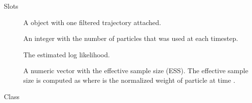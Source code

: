 \documentclass[letterpaper]{book}
\begin{document}
\begin{Section}{Slots}

\begin{description}

\item[] A  object with one filtered
trajectory attached.

\item[] An integer with the number of particles that was
used at each timestep.

\item[] The estimated log likelihood.

\item[] A numeric vector with the effective sample size (ESS).
The effective sample size is computed as
 where  is the normalized
weight of particle  at time .

\end{description}
\end{Section}
%
\begin{Description}
Class 
\end{Description}
%
\end{document}
